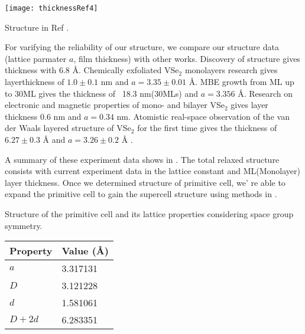 \begin{marginfigure}
	\texttt{[image: thicknessRef4]}
	\caption[Structure in Ref \cite{PhysRevB.102.115149}]{
		Structure in Ref \cite{PhysRevB.102.115149}.
	}
\end{marginfigure}

For varifying the reliability of our structure, we compare our structure data (lattice parmater $a$, film thickness) with other works. Discovery of structure  gives thickness with 6.8 Å. Chemically exfoliated VSe$_2$ monolayers research  gives layerthickness of $1.0 \pm 0.1$ nm and $a = 3.35 \pm 0.01$ Å. MBE growth from ML up to 30ML  gives the thickness of ~18.3 nm(30MLs) and $a = 3.356$ Å. Research on electronic and magnetic properties of mono- and bilayer VSe$_2$  gives layer thickness $0.6$ nm and $a = 0.34$ nm. Atomistic real-space observation of the van der Waals layered structure of VSe$_2$ for the first time  gives the thickness of $6.27 \pm 0.3$ Å and $a = 3.26 \pm 0.2$ Å .

A summary of these experiment data shows in . The total relaxed structure consists with current experiment data in the lattice constant and ML(Monolayer) layer thickness. Once we determined structure of primitive cell, we' re able to expand the primitive cell to gain the supercell structure using methods in .

\begin{margintable}
	\caption[Structure of the primitive cell and its lattice properties considering space group symmetry]{
		Structure of the primitive cell and its lattice properties considering space group symmetry.
	}
	\begin{tabular}{ll}
	\toprule
	Property & Value (Å)\\
	\midrule
	$a$ 	& 3.317131 \\
	$D$ 	& 3.121228 \\
	$d$ 	& 1.581061 \\
	$D + 2d$& 6.283351 \\
	\bottomrule
	\end{tabular}
\end{margintable}

